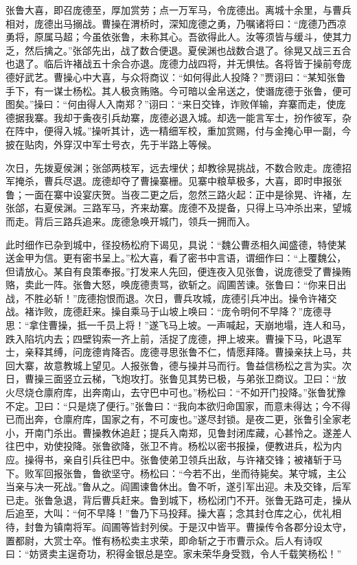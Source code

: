 张鲁大喜，即召庞德至，厚加赏劳；点一万军马，令庞德出。离城十余里，与曹兵相对，庞德出马搦战。曹操在渭桥时，深知庞德之勇，乃嘱诸将曰：“庞德乃西凉勇将，原属马超；今虽依张鲁，未称其心。吾欲得此人。汝等须皆与缓斗，使其力乏，然后擒之。”张郃先出，战了数合便退。夏侯渊也战数合退了。徐晃又战三五合也退了。临后许褚战五十余合亦退。庞德力战四将，并无惧怯。各将皆于操前夸庞德好武艺。曹操心中大喜，与众将商议：“如何得此人投降？”贾诩曰：“某知张鲁手下，有一谋士杨松。其人极贪贿赂。今可暗以金帛送之，使谮庞德于张鲁，便可图矣。”操曰：“何由得人入南郑？”诩曰：“来日交锋，诈败佯输，弃寨而走，使庞德据我寨。我却于夤夜引兵劫寨，庞德必退入城。却选一能言军士，扮作彼军，杂在阵中，便得入城。”操听其计，选一精细军校，重加赏赐，付与金掩心甲一副，今披在贴肉，外穿汉中军士号衣，先于半路上等候。

次日，先拨夏侯渊；张郃两枝军，远去埋伏；却教徐晃挑战，不数合败走。庞德招军掩杀，曹兵尽退。庞德却夺了曹操寨栅。见寨中粮草极多，大喜，即时申报张鲁；一面在寨中设宴庆贺。当夜二更之后，忽然三路火起：正中是徐晃、许褚，左张郃，右夏侯渊。三路军马，齐来劫寨。庞德不及提备，只得上马冲杀出来，望城而走。背后三路兵追来。庞德急唤开城门，领兵一拥而入。

此时细作已杂到城中，径投杨松府下谒见，具说：“魏公曹丞相久闻盛德，特使某送金甲为信。更有密书呈上。”松大喜，看了密书中言语，谓细作曰：“上覆魏公，但请放心。某自有良策奉报。”打发来人先回，便连夜入见张鲁，说庞德受了曹操贿赂，卖此一阵。张鲁大怒，唤庞德责骂，欲斩之。阎圃苦谏。张鲁曰：“你来日出战，不胜必斩！”庞德抱恨而退。次日，曹兵攻城，庞德引兵冲出。操令许褚交战。褚诈败，庞德赶来。操自乘马于山坡上唤曰：“庞令明何不早降？”庞德寻思：“拿住曹操，抵一千员上将！”遂飞马上坡。一声喊起，天崩地塌，连人和马，跌入陷坑内去；四壁钩索一齐上前，活捉了庞德，押上坡来。曹操下马，叱退军士，亲释其缚，问庞德肯降否。庞德寻思张鲁不仁，情愿拜降。曹操亲扶上马，共回大寨，故意教城上望见。人报张鲁，德与操并马而行。鲁益信杨松之言为实。次日，曹操三面竖立云梯，飞炮攻打。张鲁见其势已极，与弟张卫商议。卫曰：“放火尽烧仓廪府库，出奔南山，去守巴中可也。”杨松曰：“不如开门投降。”张鲁犹豫不定。卫曰：“只是烧了便行。”张鲁曰：“我向本欲归命国家，而意未得达；今不得已而出奔，仓廪府库，国家之有，不可废也。”遂尽封锁。是夜二更，张鲁引全家老小，开南门杀出。曹操教休追赶；提兵入南郑，见鲁封闭库藏，心甚怜之。遂差人往巴中，劝使投降。张鲁欲降，张卫不肯。杨松以密书报操，便教进兵，松为内应。操得书，亲自引兵往巴中。张鲁使弟卫领兵出敌，与许褚交锋；被褚斩于马下。败军回报张鲁，鲁欲坚守。杨松曰：“今若不出，坐而待毙矣。某守城，主公当亲与决一死战。”鲁从之。阎圃谏鲁休出。鲁不听，遂引军出迎。未及交锋，后军已走。张鲁急退，背后曹兵赶来。鲁到城下，杨松闭门不开。张鲁无路可走，操从后追至，大叫：“何不早降！”鲁乃下马投拜。操大喜；念其封仓库之心，优礼相待，封鲁为镇南将军。阎圃等皆封列侯。于是汉中皆平。曹操传令各郡分设太守，置都尉，大赏士卒。惟有杨松卖主求荣，即命斩之于市曹示众。后人有诗叹曰：“妨贤卖主逞奇功，积得金银总是空。家未荣华身受戮，令人千载笑杨松！”

